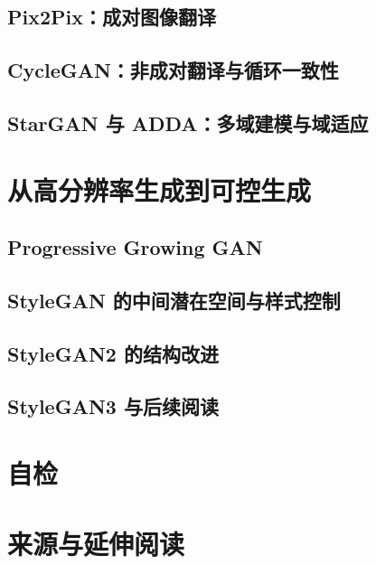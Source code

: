 \subsection{Pix2Pix：成对图像翻译}
\label{subsec:gan-pix2pix}
\contentplaceholder

\subsection{CycleGAN：非成对翻译与循环一致性}
\label{subsec:gan-cyclegan}
\contentplaceholder

\subsection{StarGAN 与 ADDA：多域建模与域适应}
\label{subsec:gan-domains}
\contentplaceholder

\section{从高分辨率生成到可控生成}
\label{sec:gan-controllability}
\contentplaceholder

\subsection{Progressive Growing GAN}
\label{subsec:gan-progressive}
\contentplaceholder

\subsection{StyleGAN 的中间潜在空间与样式控制}
\label{subsec:gan-stylegan}
\contentplaceholder

\subsection{StyleGAN2 的结构改进}
\label{subsec:gan-stylegan2}
\contentplaceholder

\subsection{StyleGAN3 与后续阅读}
\label{subsec:gan-future}
\contentplaceholder

\section{自检}
\label{sec:gan-review}
\contentplaceholder

\section{来源与延伸阅读}
\label{sec:gan-reading}
\contentplaceholder

